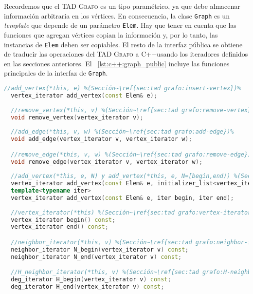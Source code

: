 \documentclass[%
    a4paper,%
    fontsize=12pt,%
    DIV=12,
    twoside,%
    openright,%
    titlepage=true,%
    headsepline,%
    toc=bibliography,%
    parskip=half,%
    cleardoublepage=empty,%
    headings=big,%
]{scrbook}
\makeatletter
\newcommand{\Grafo}{\textsc{Grafo}\xspace}
\newcommand{\CPPCode}[2][]{\lstinline[language=C++,basicstyle={\ttfamily},#1]@#2@}
\newcommand{\Graph}{\CPPCode{Graph}\xspace}
\DeclareRobustCommand{\CPP}{C\nolinebreak[4]\hspace{-.05em}\raisebox{.4ex}{\relsize{-3}\textbf{++}}\xspace}
\def\CPP{C++}%
\makeatother
\begin{document}
Recordemos que el TAD \Grafo es un tipo paramétrico, ya que debe almacenar información arbitraria en los vértices.  En consecuencia, la clase \Graph es un \emph{template} que depende de un parámetro \CPPCode{Elem}.  Hay que tener en cuenta que las funciones que agregan vértices copian la información y, por lo tanto, las instancias de \CPPCode{Elem} deben ser copiables.  El resto de la interfaz pública se obtiene de traducir las operaciones del TAD \Grafo a \CPP usando los iteradores definidos en las secciones anteriores.  El \lstlistingname~\ref{lst:c++:graph_public} incluye las funciones principales de la interfaz de \CPPCode{Graph}.

\begin{lstlisting}[caption={Interfaz de la clase \CPPCode{Graph}.},gobble=2,name=graph_public,float=h,label={lst:c++:graph_public},language=C++,xleftmargin=1em,xrightmargin=1em]
  //add_vertex(*this, e) %(Sección~\ref{sec:tad grafo:insert-vertex})%
  vertex_iterator add_vertex(const Elem& e);
  
  //remove_vertex(*this, v) %(Sección~\ref{sec:tad grafo:remove-vertex})%
  void remove_vertex(vertex_iterator v);
  
  //add_edge(*this, v, w) %(Sección~\ref{sec:tad grafo:add-edge})%
  void add_edge(vertex_iterator v, vertex_iterator w);

  //remove_edge(*this, v, w) %(Sección~\ref{sec:tad grafo:remove-edge})%
  void remove_edge(vertex_iterator v, vertex_iterator w);
  
  //add_vertex(*this, e, N) y add_vertex(*this, e, N=[begin,end)) %(Sección~\ref{sec:tad grafo:add-vertex})%
  vertex_iterator add_vertex(const Elem& e, initializer_list<vertex_iterator> N)
  template<typename iter>
  vertex_iterator add_vertex(const Elem& e, iter begin, iter end);
  
  //vertex_iterator(*this) %(Sección~\ref{sec:tad grafo:vertex-iterator})%
  vertex_iterator begin() const;
  vertex_iterator end() const;

  //neighbor_iterator(*this, v) %(Sección~\ref{sec:tad grafo:neighbor-iterator})%
  neighbor_iterator N_begin(vertex_iterator v) const;
  neighbor_iterator N_end(vertex_iterator v) const;

  //H_neighbor_iterator(*this, v) %(Sección~\ref{sec:tad grafo:H-neighbors})%
  deg_iterator H_begin(vertex_iterator v) const;
  deg_iterator H_end(vertex_iterator v) const;
\end{lstlisting}
\end{document}

